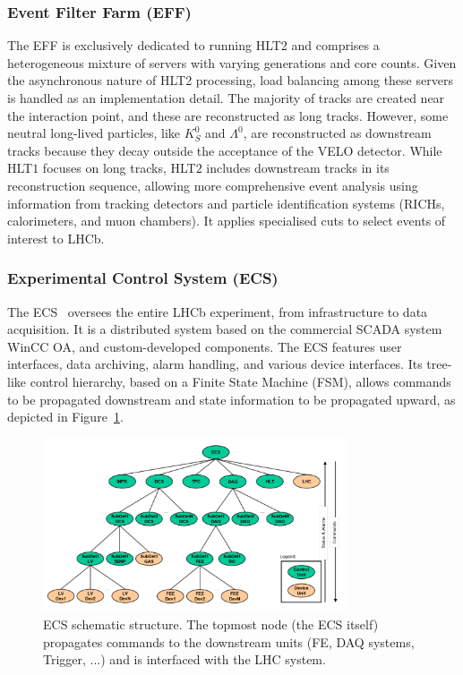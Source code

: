 \subsubsection{Event Filter Farm (EFF)}

The EFF is exclusively dedicated to running HLT2 and comprises a heterogeneous mixture of servers with varying generations and core counts. Given the asynchronous nature of HLT2 processing, load balancing among these servers is handled as an implementation detail.
The majority of tracks are created near the interaction point, and these are reconstructed as long tracks. However, some neutral long-lived particles, like $K^0_S$ and $\Lambda^0$, are reconstructed as downstream tracks because they decay outside the acceptance of the VELO detector. While HLT$1$ focuses on long tracks, HLT$2$ includes downstream tracks in its reconstruction sequence, allowing more comprehensive event analysis using information from tracking detectors and particle identification systems (RICHs, calorimeters, and muon chambers). It applies specialised cuts to select events of interest to LHCb.


\subsubsection{Experimental Control System (ECS)}\label{sec:ecs}

The ECS~\cite{GranadoCardoso:2702137} oversees the entire LHCb experiment, from infrastructure to data acquisition. It is a distributed system based on the commercial SCADA system WinCC OA, and custom-developed components. The ECS features user interfaces, data archiving, alarm handling, and various device interfaces. Its tree-like control hierarchy, based on a Finite State Machine (FSM), allows commands to be propagated downstream and state information to be propagated upward, as depicted in Figure~\ref{fig:ECS_tree}.
\begin{figure}
    \centering
    \includegraphics[width=0.8\textwidth]{figures/ECS_tree.png}
    \caption{ECS schematic structure. The topmost node (the ECS itself) propagates commands to the downstream units (FE, DAQ systems, Trigger, ...) and is interfaced with the LHC system.}
    \label{fig:ECS_tree}
\end{figure}

